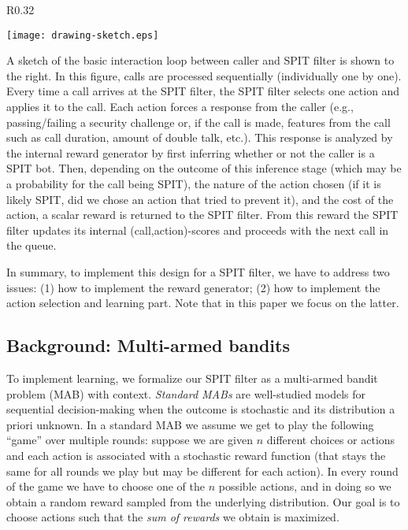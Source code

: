 \documentclass{llncs}
\begin{document}
\begin{wrapfigure}{R}{0.32\textwidth}
\vspace{-20pt}
\begin{center}
\texttt{[image: drawing-sketch.eps]}
\end{center}
\vspace{-20pt}
\end{wrapfigure}
A sketch of the basic interaction loop between caller and SPIT filter is shown to the right. In this figure,
calls are processed sequentially (individually one by one). Every time a call arrives at the SPIT filter, 
the SPIT filter selects one action and applies it to the call. Each action forces a response from the caller
(e.g., passing/failing a security challenge or, if the call is made, features from the call such as call
duration, amount of double talk, etc.). This response is analyzed by the internal reward generator by first
inferring whether or not the caller is a SPIT bot. Then, depending on the outcome of this inference stage
(which may be a probability for the call being SPIT), the nature of the action chosen (if it is likely SPIT,
did we chose an action that tried to prevent it), and the cost of the action, a scalar reward is returned to
the SPIT filter. From this reward the SPIT filter updates its internal (call,action)-scores and proceeds
with the next call in the queue. 

In summary, to implement this design for a SPIT filter, we have to address two issues: (1) how to implement
the reward generator; (2) how to implement the action selection and learning part. Note that in this paper
we focus on the latter. 


\subsection{Background: Multi-armed bandits}
\label{seq:MAB}
To implement learning, we formalize our SPIT filter as a 
multi-armed bandit problem (MAB) with context. {\em Standard MABs} are well-studied
models for sequential decision-making when the outcome is stochastic and its distribution
a priori unknown. In a standard MAB we assume we get to play the following ``game'' over
multiple rounds: suppose we are given $n$ different choices or actions and each action
is associated with a stochastic reward function (that stays the same for all rounds we play
but may be different for each action). In every round of the game we have to choose one
of the $n$ possible actions, and in doing so we obtain a random reward sampled from 
the underlying distribution. Our goal is to choose actions such that the 
{\em sum of rewards} we obtain is maximized.
\end{document}
